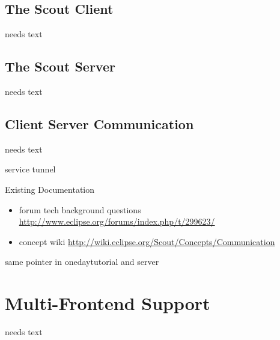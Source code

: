 \documentclass[a4paper,10pt,twoside]{book}
\begin{document}
\subsection{The Scout Client}
needs text

\subsection{The Scout Server}
needs text

\subsection{Client Server Communication}
needs text

service tunnel

\noindent Existing Documentation
\begin{itemize}
  \item forum tech background questions \url{http://www.eclipse.org/forums/index.php/t/299623/}
  \item concept wiki \url{http://wiki.eclipse.org/Scout/Concepts/Communication}
\end{itemize}

same pointer in onedaytutorial and server

\section{Multi-Frontend Support}
needs text



\ifx\wholebook\relax\else
   
   
\end{document}
